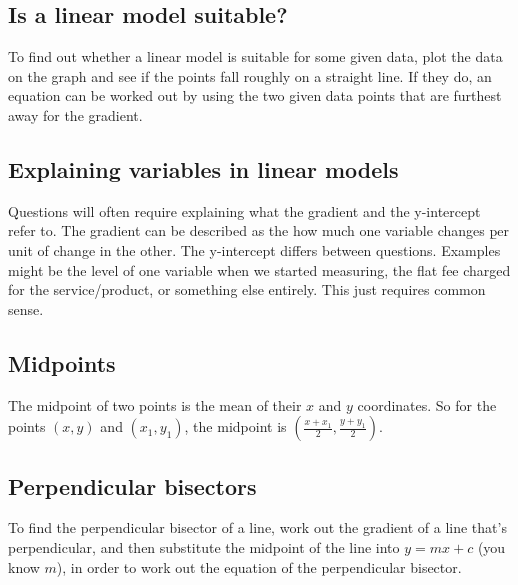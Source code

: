 \subsection{Is a linear model suitable?}
To find out whether a linear model is suitable for some given data, plot the data on the graph and see if the points fall roughly  on a straight line. If they do, an equation can be worked out by using the two given data points that are furthest away for the gradient.

\subsection{Explaining variables in linear models}
Questions will often require explaining what the gradient and the y-intercept refer to. The gradient can be described as the how much one variable changes \b{per} unit of change in the other. The y-intercept differs between questions. Examples might be the level of one variable when we started measuring, the flat fee charged for the service/product, or something else entirely. This just requires common sense.

\subsection{Midpoints}
The midpoint of two points is the mean of their $x$ and $y$ coordinates. So for the points $(x, y)$ and $(x_1, y_1)$, the midpoint is $(\frac{x+x_1}{2}, \frac{y+y_1}{2})$.

\subsection{Perpendicular bisectors}
To find the perpendicular bisector of a line, work out the gradient of a line that's perpendicular, and then substitute the midpoint of the line into $y=mx+c$ (you know $m$), in order to work out the equation of the perpendicular bisector.
